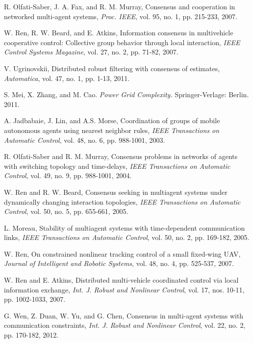 \documentclass[letterpaper, 10 pt, conference]{ieeeconf}
\begin{document}
\begin{thebibliography}{99}
R. Olfati-Saber, J. A. Fax, and R. M. Murray, Consensus and cooperation
in networked multi-agent systems, \emph{Proc. IEEE}, vol. 95, no. 1, pp. 215-233, 2007.

W. Ren, R. W. Beard, and E. Atkins,
Information consensus in multivehicle cooperative control: Collective group behavior through local interaction,
\emph{IEEE Control Systems Magazine}, vol. 27, no. 2, pp. 71-82, 2007.

V. Ugrinovskii,
Distributed robust filtering with  consensus of
estimates,
\emph{Automatica}, vol. 47, no. 1, pp. 1-13, 2011.

S. Mei, X. Zhang, and M. Cao. \emph{Power Grid Complexity.} Springer-Verlage: Berlin. 2011.

A. Jadbabaie, J. Lin, and A.S. Morse, Coordination of groups
of mobile autonomous agents using nearest neighbor rules,
\emph{IEEE Transactions on Automatic Control}, vol. 48, no. 6,
pp. 988-1001, 2003.

R. Olfati-Saber and R. M. Murray,
Consensus problems in networks of agents with
switching topology and time-delays,
\emph{IEEE Transactions on Automatic Control}, vol. 49, no. 9,
pp. 988-1001, 2004.



W. Ren and R. W. Beard, Consensus seeking in multiagent
systems under dynamically changing interaction topologies,
\emph{IEEE Transactions on Automatic Control}, vol. 50, no. 5,
pp. 655-661, 2005.

L. Moreau,
Stability of multiagent systems with time-dependent communication links,
\emph{IEEE Transactions on Automatic Control}, vol. 50, no. 2,
pp. 169-182, 2005.

W. Ren,
On constrained nonlinear tracking control of a small fixed-wing UAV,
 \emph{Journal of Intelligent and Robotic Systems}, vol. 48, no. 4,  pp. 525-537, 2007.

W. Ren and E. Atkins,
Distributed multi-vehicle coordinated control
via local information exchange,
\emph{Int. J. Robust and Nonlinear Control},
vol. 17, nos. 10-11, pp. 1002-1033, 2007.

G. Wen, Z. Duan, W. Yu, and G. Chen,
Consensus in multi-agent
systems with communication constraints,
\emph{Int. J. Robust and Nonlinear Control}, vol. 22, no. 2, pp. 170-182, 2012.


\end{thebibliography}
\end{document}
